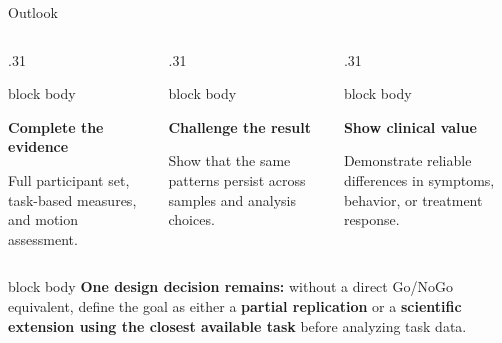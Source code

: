 \documentclass[aspectratio=169,10pt]{beamer}
\begin{document}
\begin{frame}{Outlook}
\begin{columns}[T,onlytextwidth]
  \begin{column}{.31\textwidth}
    \begin{beamercolorbox}[rounded=true,sep=.32cm]{block body}
      \centering{\color{Blue}\Large\faDatabase}\par\vspace{.14cm}
      {\color{Navy}\large\bfseries Complete the evidence}\par\vspace{.14cm}
      \small Full participant set, task-based measures, and motion assessment.
    \end{beamercolorbox}
  \end{column}
  \begin{column}{.31\textwidth}
    \begin{beamercolorbox}[rounded=true,sep=.32cm]{block body}
      \centering{\color{Amber}\Large\faVials}\par\vspace{.14cm}
      {\color{Navy}\large\bfseries Challenge the result}\par\vspace{.14cm}
      \small Show that the same patterns persist across samples and analysis choices.
    \end{beamercolorbox}
  \end{column}
  \begin{column}{.31\textwidth}
    \begin{beamercolorbox}[rounded=true,sep=.32cm]{block body}
      \centering{\color{Teal}\Large\faHeartbeat}\par\vspace{.14cm}
      {\color{Navy}\large\bfseries Show clinical value}\par\vspace{.14cm}
      \small Demonstrate reliable differences in symptoms, behavior, or treatment response.
    \end{beamercolorbox}
  \end{column}
\end{columns}

\vspace{.48cm}
\begin{beamercolorbox}[rounded=true,sep=.30cm]{block body}
  {\color{Amber}\bfseries One design decision remains:}\quad
  \small without a direct Go/NoGo equivalent, define the goal as either a \textbf{partial replication} or a \textbf{scientific extension using the closest available task} before analyzing task data.
\end{beamercolorbox}

\vspace{.45cm}
\end{frame}
\end{document}
